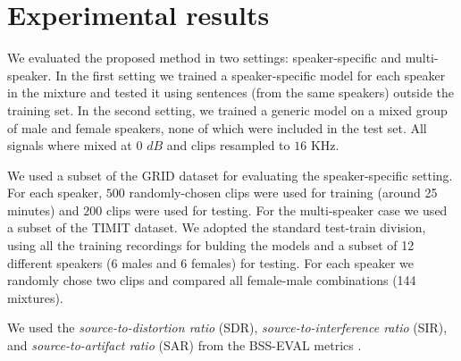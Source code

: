 \section{Experimental results}
\label{sec:experiments}


 We evaluated the proposed method in two settings: speaker-specific and multi-speaker. In the first setting 
we trained a speaker-specific model for each speaker in the mixture and tested it using sentences (from the same speakers) outside the training set. 
In the second setting, we trained a generic model on a mixed group of male and female speakers, none of which were included in the test set.
All signals where mixed at 0 $dB$ and clips resampled to $16$ KHz. 

 We used a subset of the GRID dataset \cite{cooke2006audio} for evaluating the speaker-specific setting.
For each speaker, $500$ randomly-chosen clips were used for training (around 25 minutes) and $200$ clips were used for testing.
For the multi-speaker case we used a subset of the TIMIT dataset. We adopted the standard test-train division, using all the training recordings for bulding the models
and a subset of 12 different speakers (6 males and 6 females) for testing. For each speaker we randomly chose two clips and compared
all female-male combinations (144 mixtures). 

 We used the \emph{source-to-distortion ratio} (SDR), \emph{source-to-interference ratio} (SIR), and
\emph{source-to-artifact ratio} (SAR) from the BSS-EVAL metrics \cite{vincent2006performance}. 
%
%

